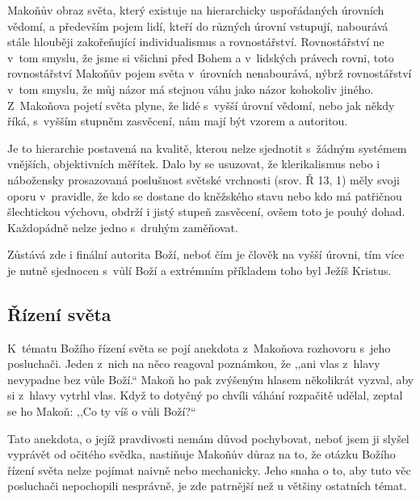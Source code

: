 Makoňův obraz světa, který existuje na hierarchicky uspořádaných úrovních
vědomí, a především pojem lidí, kteří do různých úrovní vstupují, nabourává
stále hlouběji zakořeňující individualismus a rovnostářství. Rovnostářství ne
v~tom smyslu, že jsme si všichni před Bohem a v~lidských právech rovni, toto
rovnostářství Makoňův pojem světa v~úrovních nenabourává, nýbrž rovnostářství
v~tom smyslu, že můj názor má stejnou váhu jako názor kohokoliv jiného.
Z~Makoňova pojetí světa plyne, že lidé s~vyšší úrovní vědomí, nebo jak někdy
říká, s~vyšším stupněm zasvěcení, nám mají být vzorem a autoritou.

Je to hierarchie postavená na kvalitě, kterou nelze sjednotit s~žádným systémem
vnějších, objektivních měřítek. Dalo by se usuzovat, že klerikalismus nebo i
nábožensky prosazovaná poslušnost světské vrchnosti (srov. Ř 13, 1) měly svoji oporu v~pravidle,
že kdo se dostane do kněžského stavu nebo kdo má patřičnou šlechtickou výchovu,
obdrží i jistý stupeň zasvěcení, ovšem toto je pouhý dohad. Každopádně nelze
jedno s~druhým zaměňovat.

Zůstává zde i finální autorita Boží, neboť čím je člověk na vyšší úrovni, tím
více je nutně sjednocen s~vůlí Boží a extrémním příkladem toho byl Ježíš
Kristus.

\subsection{Řízení světa}

K~tématu Božího řízení světa se pojí anekdota z~Makoňova rozhovoru s~jeho
posluchači. Jeden z~nich na něco reagoval poznámkou, že ,,ani vlas z~hlavy
nevypadne bez vůle Boží.`` Makoň ho pak zvýšeným hlasem několikrát vyzval, aby si
z~hlavy vytrhl vlas. Když to dotyčný po chvíli váhání rozpačitě udělal, zeptal
se ho Makoň: ,,Co ty víš o vůli Boží?{}``

Tato anekdota, o jejíž pravdivosti nemám důvod pochybovat, neboť jsem ji slyšel
vyprávět od očitého svědka, nastiňuje Makoňův důraz na to, že otázku Božího
řízení světa nelze pojímat naivně nebo mechanicky. Jeho snaha o to, aby tuto věc
posluchači nepochopili nesprávně, je zde patrnější než u většiny ostatních
témat.

